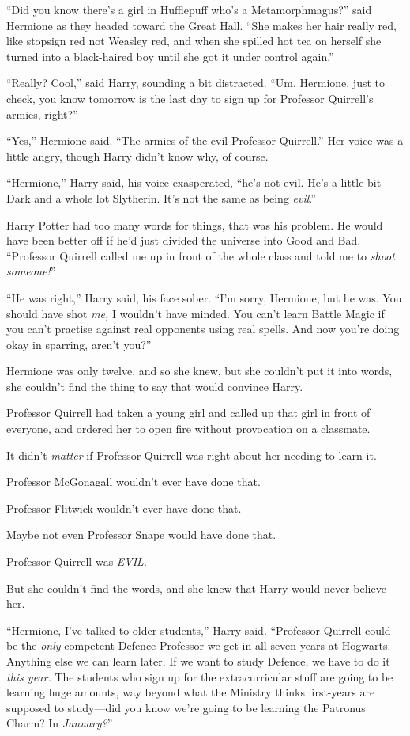 “Did you know there’s a girl in Hufflepuff who’s a Metamorphmagus?” said Hermione as they headed toward the Great Hall. “She makes her hair really red, like stopsign red not Weasley red, and when she spilled hot tea on herself she turned into a black-haired boy until she got it under control again.”

“Really? Cool,” said Harry, sounding a bit distracted. “Um, Hermione, just to check, you know tomorrow is the last day to sign up for Professor Quirrell’s armies, right?”

“Yes,” Hermione said. “The armies of the evil Professor Quirrell.” Her voice was a little angry, though Harry didn’t know why, of course.

“Hermione,” Harry said, his voice exasperated, “he’s not evil. He’s a little bit Dark and a whole lot Slytherin. It’s not the same as being \emph{evil}.”

Harry Potter had too many words for things, that was his problem. He would have been better off if he’d just divided the universe into Good and Bad. “Professor Quirrell called me up in front of the whole class and told me to \emph{shoot someone!}”

“He was right,” Harry said, his face sober. “I’m sorry, Hermione, but he was. You should have shot \emph{me,} I wouldn’t have minded. You can’t learn Battle Magic if you can’t practise against real opponents using real spells. And now you’re doing okay in sparring, aren’t you?”

Hermione was only twelve, and so she knew, but she couldn’t put it into words, she couldn’t find the thing to say that would convince Harry.

Professor Quirrell had taken a young girl and called up that girl in front of everyone, and ordered her to open fire without provocation on a classmate.

It didn’t \emph{matter} if Professor Quirrell was right about her needing to learn it.

Professor McGonagall wouldn’t ever have done that.

Professor Flitwick wouldn’t ever have done that.

Maybe not even Professor Snape would have done that.

Professor Quirrell was \emph{EVIL}.

But she couldn’t find the words, and she knew that Harry would never believe her.

“Hermione, I’ve talked to older students,” Harry said. “Professor Quirrell could be the \emph{only} competent Defence Professor we get in all seven years at Hogwarts. Anything else we can learn later. If we want to study Defence, we have to do it \emph{this year.} The students who sign up for the extracurricular stuff are going to be learning huge amounts, way beyond what the Ministry thinks first-years are supposed to study—did you know we’re going to be learning the Patronus Charm? In \emph{January?}”

